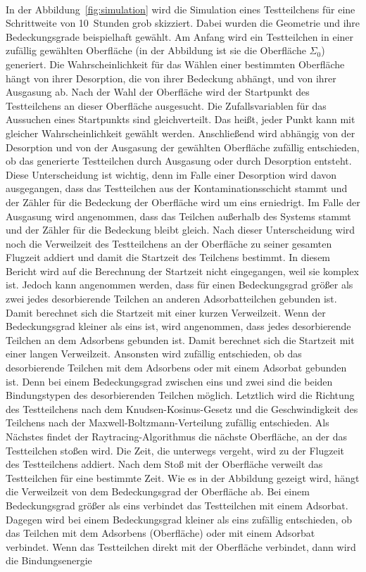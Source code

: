 \documentclass{listhesis}
\begin{document}
\paragraph{}
In der Abbildung~\ref{fig:simulation} wird die Simulation eines Testteilchens für eine Schrittweite von \SI{10}{Stunden} grob skizziert. Dabei wurden die Geometrie und ihre Bedeckungsgrade beispielhaft gewählt. Am Anfang wird ein Testteilchen in einer zufällig gewählten Oberfläche (in der Abbildung ist sie die Oberfläche $\Sigma_0$) generiert. Die Wahrscheinlichkeit für das Wählen einer bestimmten Oberfläche hängt von ihrer Desorption, die von ihrer Bedeckung abhängt, und von ihrer Ausgasung ab. Nach der Wahl der Oberfläche wird der Startpunkt des Testteilchens an dieser Oberfläche ausgesucht. Die Zufallsvariablen für das Aussuchen eines Startpunkts sind gleichverteilt. Das heißt, jeder Punkt kann mit gleicher Wahrscheinlichkeit gewählt werden. Anschließend wird abhängig von der Desorption und von der Ausgasung der gewählten Oberfläche zufällig entschieden, ob das generierte Testteilchen durch Ausgasung oder durch Desorption entsteht. Diese Unterscheidung ist wichtig, denn im Falle einer Desorption wird davon ausgegangen, dass das Testteilchen aus der Kontaminationsschicht stammt und der Zähler für die Bedeckung der Oberfläche wird um eins erniedrigt. Im Falle der Ausgasung wird angenommen, dass das Teilchen außerhalb des Systems stammt und der Zähler für die Bedeckung bleibt gleich. Nach dieser Unterscheidung wird noch die Verweilzeit des Testteilchens an der Oberfläche zu seiner gesamten Flugzeit addiert und damit die Startzeit des Teilchens bestimmt. In diesem Bericht wird auf die Berechnung der Startzeit nicht eingegangen, weil sie komplex ist. Jedoch kann angenommen werden, dass für einen Bedeckungsgrad größer als zwei jedes desorbierende Teilchen an anderen Adsorbatteilchen gebunden ist. Damit berechnet sich die Startzeit mit einer kurzen Verweilzeit. Wenn der Bedeckungsgrad kleiner als eins ist, wird angenommen, dass jedes desorbierende Teilchen an dem Adsorbens gebunden ist. Damit berechnet sich die Startzeit mit einer langen Verweilzeit. Ansonsten wird zufällig entschieden, ob das desorbierende Teilchen mit dem Adsorbens oder mit einem Adsorbat gebunden ist. Denn bei einem Bedeckungsgrad zwischen eins und zwei sind die beiden Bindungstypen des desorbierenden Teilchen möglich. Letztlich wird die Richtung des Testteilchens nach dem Knudsen-Kosinus-Gesetz und die Geschwindigkeit des Teilchens nach der Maxwell-Boltzmann-Verteilung zufällig entschieden. Als Nächstes findet der Raytracing-Algorithmus die nächste Oberfläche, an der das Testteilchen stoßen wird. Die Zeit, die unterwegs vergeht, wird zu der Flugzeit des Testteilchens addiert. Nach dem Stoß mit der Oberfläche verweilt das Testteilchen für eine bestimmte Zeit. Wie es in der Abbildung gezeigt wird, hängt die Verweilzeit von dem Bedeckungsgrad der Oberfläche ab. Bei einem Bedeckungsgrad größer als eins verbindet das Testteilchen mit einem Adsorbat. Dagegen wird bei einem Bedeckungsgrad kleiner als eins zufällig entschieden, ob das Teilchen mit dem Adsorbens (Oberfläche) oder mit einem Adsorbat verbindet. Wenn das Testteilchen direkt mit der Oberfläche verbindet, dann wird die Bindungsenergie 
\end{document}
